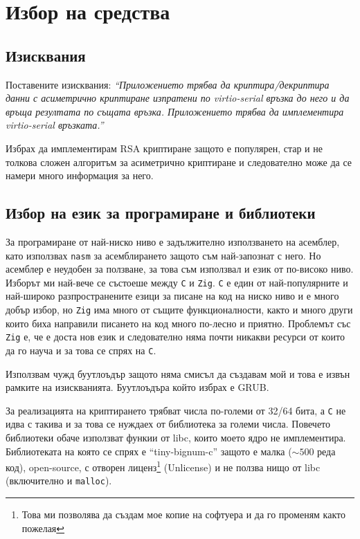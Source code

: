 \section{Избор на средства} %
\subsection{Изисквания}
Поставените изисквания: \textit{``Приложението трябва да криптира/декриптира данни с асиметрично криптиране изпратени по virtio-serial връзка до него и да връща резултата по същата връзка. Приложението трябва да имплементира virtio-serial връзката.''}

Избрах да имплементирам RSA криптиране защото е популярен, стар и не толкова сложен алгоритъм за асиметрично криптиране и следователно може да се намери много информация за него.

\subsection{Избор на език за програмиране и библиотеки} \label{langchoice}
За програмиране от най-ниско ниво е задължително използването на асемблер, като използвах {\tt nasm} за асемблирането защото съм най-запознат с него. Но асемблер е неудобен за ползване, за това съм използвал и език от по-високо ниво. Изборът ми най-вече се състоеше между {\tt C} и {\tt Zig}. {\tt C} е един от най-популярните и най-широко разпространените езици за писане на код на ниско ниво и е много добър избор, но {\tt Zig} има много от същите функционалности, както и много други които биха направили писането на код много по-лесно и приятно. Проблемът със {\tt Zig} е, че е доста нов език и следователно няма почти никакви ресурси от които да го науча и за това се спрях на {\tt C}.

Използвам чужд буутлоъдър защото няма смисъл да създавам мой и това е извън рамките на изискванията. Буутлоъдъра който избрах е GRUB.

За реализацията на криптирането трябват числа по-големи от 32/64 бита, а {\tt C} не идва с такива и за това се нуждаех от библиотека за големи числа. Повечето библиотеки обаче използват функии от libc, които моето ядро не имплементира. Библиотеката на която се спрях е ``tiny-bignum-c''\parencite{tinybignumc} защото е малка ($\sim500$ реда код), open-source, с отворен лиценз\footnote{Това ми позволява да създам мое копие на софтуера и да го променям както пожелая} (Unlicense) и не ползва нищо от libc (включително и {\tt malloc}).

